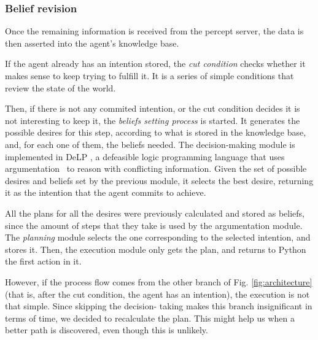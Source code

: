 \subsubsection{Belief revision}
    Once the remaining information is received from the percept server, the data
    is then asserted into the agent's knowledge base. 
    
    If the agent already has an intention stored, the \textit{cut condition}
    checks whether it makes sense to keep trying to fulfill it. It is a series
    of simple conditions that review the state of the world.

    Then, if there is not any commited intention, or the cut condition decides
    it is not interesting to keep it, the \textit{beliefs setting process} is
    started. It generates the possible desires for this step, according to what
    is stored in the knowledge base, and, for each one of them, the beliefs
    needed.  The decision-making module is implemented in
    DeLP\cite{Rotstein:2007} \cite{Ferretti:2008}, a defeasible logic
    programming language that uses argumentation \cite{DBLP:conf/comma/2008}\ to
    reason with conflicting information.  Given the set of possible desires and
    beliefs set by the previous module, it selects the best desire, returning it
    as the intention that the agent commits to achieve.

    All the plans for all the desires were previously calculated and stored as 
    beliefs, since the amount of steps that they take is used by the 
    argumentation module. The \textit{planning} module selects the one 
    corresponding to the selected intention, and stores it. Then, the 
    execution module only gets the plan, and returns to Python the first 
    action in it.

    However, if the process flow comes from the other branch of Fig. 
    \ref{fig:architecture} (that is, after the cut condition, the agent has an 
    intention), the execution is not that simple. Since skipping the decision-
    taking makes this branch insignificant in terms of time, we decided to 
    recalculate the plan. This might help us when a better path is discovered, 
    even though this is unlikely.




    
